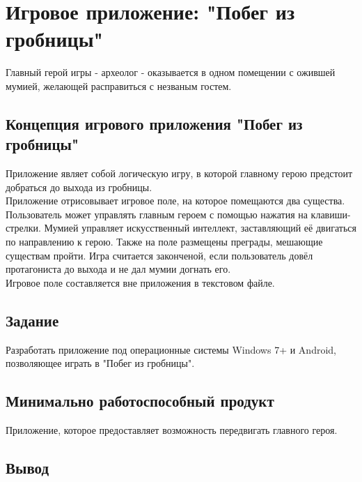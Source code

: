 





\tableofcontents
\newpage



\section{Игровое приложение: "Побег из гробницы"}

Главный герой игры - археолог - оказывается в одном помещении с ожившей мумией, желающей расправиться с незваным гостем.\\



\subsection{Концепция игрового приложения "Побег из гробницы"}

Приложение являет собой логическую игру, в которой главному герою предстоит добраться до выхода из гробницы.\\

Приложение отрисовывает игровое поле, на которое помещаются два существа. Пользователь может управлять главным героем с помощью нажатия на клавиши-стрелки. Мумией управляет искусственный интеллект, заставляющий её двигаться по направлению к герою. Также на поле размещены преграды, мешающие существам пройти. Игра считается законченой, если пользователь довёл протагониста до выхода и не дал мумии догнать его.\\
Игровое поле составляется вне приложения в текстовом файле.\\

\subsection{Задание}

Разработать приложение под операционные системы Windows 7+ и Android, позволяющее играть в "Побег из гробницы". 

\subsection{Минимально работоспособный продукт}

Приложение, которое предоставляет возможность передвигать главного героя.

\subsection{Вывод}

